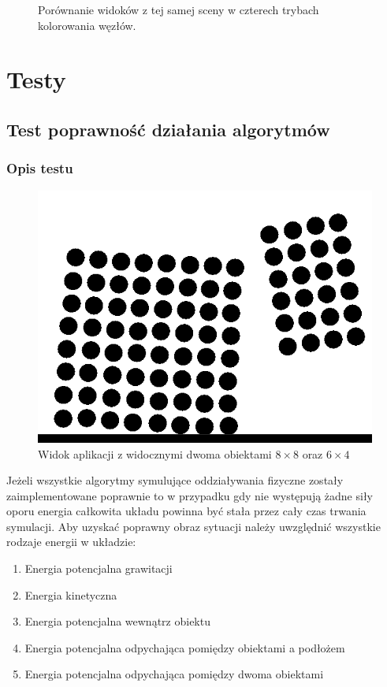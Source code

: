 \documentclass[12pt, letterpaper]{report}
\begin{document}
\begin{figure}[h]
        \caption{Porównanie widoków z tej samej sceny w czterech trybach kolorowania węzłów.}
    \end{figure}

\chapter{Testy}
    \section{Test poprawność działania algorytmów}
    \subsection{Opis testu}
    
    \begin{figure}
        \includegraphics[width=0.9\linewidth]{objects_raw} 
        \caption{Widok aplikacji z widocznymi dwoma obiektami $8 \times 8$ oraz $6 \times 4$}
    \end{figure}
    Jeżeli wszystkie algorytmy symulujące oddziaływania fizyczne zostały zaimplementowane poprawnie 
    to w przypadku gdy nie występują żadne siły oporu energia całkowita układu powinna 
    być stała przez cały czas trwania symulacji. Aby uzyskać poprawny obraz sytuacji należy 
    uwzględnić wszystkie rodzaje energii w układzie: 
    \begin{enumerate}
        \item Energia potencjalna grawitacji
        \item Energia kinetyczna
        \item Energia potencjalna wewnątrz obiektu
        \item Energia potencjalna odpychająca pomiędzy obiektami a podłożem
        \item Energia potencjalna odpychająca pomiędzy dwoma obiektami
    \end{enumerate}
\end{document}
